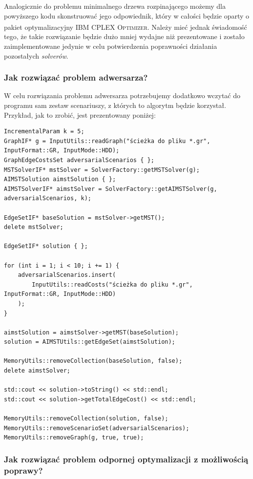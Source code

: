 Analogicznie do problemu minimalnego drzewa rozpinającego możemy dla powyższego kodu skonstruować jego odpowiednik, który w całości będzie oparty o pakiet optymalizacyjny \textsc{IBM\textsuperscript{\textregistered} CPLEX\textsuperscript{\textregistered} Optimizer}. Należy mieć jednak świadomość tego, że takie rozwiązanie będzie dużo mniej wydajne niż prezentowane i zostało zaimplementowane jedynie w celu potwierdzenia poprawności działania pozostałych \textit{solverów}.

\subsubsection{Jak rozwiązać problem adwersarza?}

W celu rozwiązania problemu adwersarza potrzebujemy dodatkowo wczytać do programu sam zestaw scenariuszy, z których to algorytm będzie korzystał. Przykład, jak to zrobić, jest prezentowany poniżej:

\begin{verbatim}
IncrementalParam k = 5;
GraphIF* g = InputUtils::readGraph("ścieżka do pliku *.gr", InputFormat::GR, InputMode::HDD);
GraphEdgeCostsSet adversarialScenarios { };
MSTSolverIF* mstSolver = SolverFactory::getMSTSolver(g);
AIMSTSolution aimstSolution { };
AIMSTSolverIF* aimstSolver = SolverFactory::getAIMSTSolver(g,
adversarialScenarios, k);

EdgeSetIF* baseSolution = mstSolver->getMST();
delete mstSolver;

EdgeSetIF* solution { };

for (int i = 1; i < 10; i += 1) {
	adversarialScenarios.insert(
		InputUtils::readCosts("ścieżka do pliku *.gr", InputFormat::GR, InputMode::HDD)
	);
}

aimstSolution = aimstSolver->getMST(baseSolution);
solution = AIMSTUtils::getEdgeSet(aimstSolution);

MemoryUtils::removeCollection(baseSolution, false);
delete aimstSolver;

std::cout << solution->toString() << std::endl;
std::cout << solution->getTotalEdgeCost() << std::endl;

MemoryUtils::removeCollection(solution, false);
MemoryUtils::removeScenarioSet(adversarialScenarios);
MemoryUtils::removeGraph(g, true, true);
\end{verbatim}

\subsubsection{Jak rozwiązać problem odpornej optymalizacji z możliwością poprawy?}

